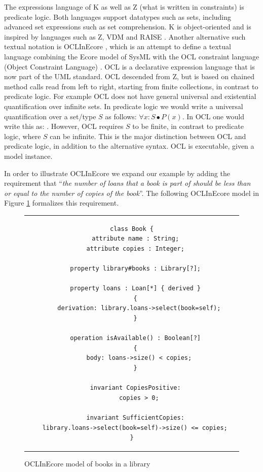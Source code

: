 The expressions language of K as well as Z 
(what is written in constraints) is predicate 
logic. Both languages support datatypes such as sets, including 
advanced set expressions such as set comprehension. K is object-oriented and 
is inspired by languages  such as Z, VDM \cite{?} and RAISE \cite{?}. Another 
alternative such textual notation is OCLInEcore \cite{?}, which is an attempt 
to define a textual language combining the Ecore model
of SysML with the OCL constraint language (Object Constraint Language) 
\cite{?}. OCL is a declarative expression language that is now part of the UML 
standard. OCL descended from Z, but is based on chained method calls read from left to right, starting from finite collections, in contrast to predicate logic. For example OCL does not have
general universal and existential quantification over infinite sets. In predicate 
logic we would write a universal quantification over a set/type 
$S$ as follows: $\forall x : S \bullet P(x)$. In OCL one would write this as:
. However, OCL requires $S$ to be finite,
in contrast to predicate logic, where $S$ can be infinite. This
is the major distinction between OCL and predicate logic, in addition to the alternative syntax. OCL is executable, given
a model instance.

In order to illustrate OCLInEcore we expand our example by adding 
the requirement that ``{\em the number of loans that a book is part 
of should be less than or equal to the 
number of copies of the book}''. The following OCLInEcore model 
in Figure \ref{fig:book-oclinecore} formalizes this requirement.

\begin{figure}
\begin{center}
\begin{tabular}{c}
\begin{lstlisting}[language=oclinecore]
class Book {
  attribute name : String;
  attribute copies : Integer;

  property library#books : Library[?];
     
  property loans : Loan[*] { derived }
  {
    derivation: library.loans->select(book=self);
  }

  operation isAvailable() : Boolean[?]
  {
    body: loans->size() < copies;
  }
     
  invariant CopiesPositive:
    copies > 0;
     
  invariant SufficientCopies:
    library.loans->select(book=self)->size() <= copies;     
}
\end{lstlisting}
\end{tabular}
\end{center}
\caption{OCLInEcore model of books in a library}
\label{fig:book-oclinecore}
\end{figure}

